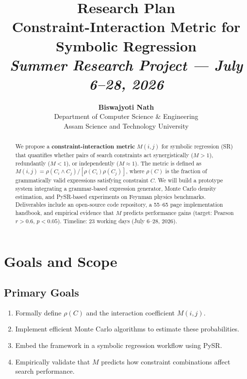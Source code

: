 \documentclass[11pt,a4paper]{article}
\title{%
  \vspace{-1cm}
  {\LARGE\bfseries\color{accent} Research Plan}\\[0.3cm]
  {\Large Constraint-Interaction Metric for Symbolic Regression}\\[0.5cm]
  {\normalsize\textit{Summer Research Project — July 6–28, 2026}}
}
\author{%
  \textbf{Biswajyoti Nath}\\
  Department of Computer Science \& Engineering\\
  Assam Science and Technology University
}
\date{}
\begin{document}
\maketitle
\thispagestyle{empty}

\begin{abstract}
We propose a \textbf{constraint-interaction metric} $M(i,j)$ for symbolic regression (SR) that quantifies whether pairs of search constraints act synergistically ($M>1$), redundantly ($M<1$), or independently ($M\approx1$). The metric is defined as $M(i,j) = \rho(C_i \wedge C_j)/[\rho(C_i)\rho(C_j)]$, where $\rho(C)$ is the fraction of grammatically valid expressions satisfying constraint $C$. We will build a prototype system integrating a grammar-based expression generator, Monte Carlo density estimation, and PySR-based experiments on Feynman physics benchmarks. Deliverables include an open-source code repository, a 55--65 page implementation handbook, and empirical evidence that $M$ predicts performance gains (target: Pearson $r > 0.6$, $p < 0.05$). Timeline: 23 working days (July 6--28, 2026).
\end{abstract}

\tableofcontents
\newpage

\section{Goals and Scope}
\label{sec:goals}

\subsection{Primary Goals}
\begin{enumerate}[label=\textbf{G\arabic*}]
  \item Formally define $\rho(C)$ and the interaction coefficient $M(i,j)$.
  \item Implement efficient Monte Carlo algorithms to estimate these probabilities.
  \item Embed the framework in a symbolic regression workflow using PySR.
  \item Empirically validate that $M$ predicts how constraint combinations affect search performance.
\end{enumerate}
\end{document}
